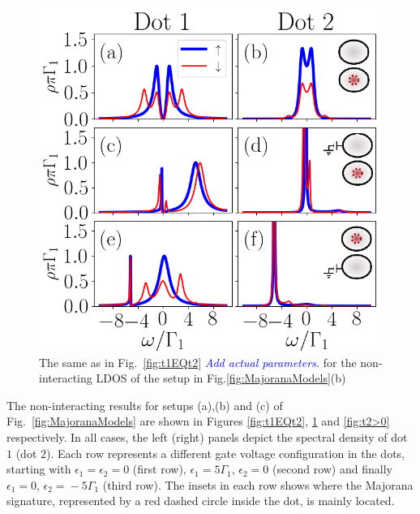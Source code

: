 \documentclass[showpacs,aps,prb,reprint,superscriptaddress]{revtex4-1}
\newcommand{\LUIS}[1]{\textcolor{blue}{\fbox{Luis} {\sl#1}}}
\begin{document}
\begin{figure}[bt]
\begin{center}
\includegraphics[scale=0.48]{Graficos/t1gt0.png}
\caption{  \label{fig:t1>0} The same as in Fig.\ \ref{fig:t1EQt2} \LUIS{Add actual parameters.} for the non-interacting LDOS of the setup in Fig.\ref{fig:MajoranaModels}(b) 
}
%
\end{center}
\end{figure}


     The non-interacting results for setups (a),(b) and (c) of Fig.\ \ref{fig:MajoranaModels} are shown in Figures \ref{fig:t1EQt2}, \ref{fig:t1>0} and \ref{fig:t2>0} respectively. In all cases, the left (right) panels depict the spectral density  of dot $1$ (dot $2$). Each row represents a different gate voltage configuration in the dots, starting with  $\epsilon_1\!=\!\epsilon_2\!=\!0$ (first row), $\epsilon_1\!=\!5\Gamma_1$, $\epsilon_2\!=\!0$ (second row) and finally $\epsilon_1\!=\!0$, $\epsilon_2\!=\!\!-5\Gamma_1$ (third row). The insets in each row shows where the Majorana signature, represented by a red dashed circle inside the dot, is mainly located. 

\end{document}

